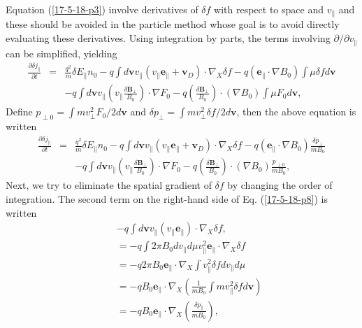 \documentclass{article}
\begin{document}
Equation (\ref{17-5-18-p3}) involve derivatives of $\delta f$ with respect to
space and $v_{\parallel}$ and these should be avoided in the particle method
whose goal is to avoid directly evaluating these derivatives. Using
integration by parts, the terms involving $\partial / \partial v_{\parallel}$
can be simplified, yielding
\begin{eqnarray}
  \frac{\partial \delta j_{\parallel}}{\partial t} & = & \frac{q^2}{m} \delta
  E_{\parallel} n_0 - q \int d\mathbf{v}v_{\parallel} (v_{\parallel}
  \mathbf{e}_{\parallel} +\mathbf{v}_D) \cdot \nabla_X \delta f - q
  (\mathbf{e}_{\parallel} \cdot \nabla B_0) \int \mu \delta f d\mathbf{v}
  \nonumber\\
  &  & - q \int d\mathbf{v}v_{\parallel} \left( v_{\parallel} \frac{\delta
  \mathbf{B}_{\perp}}{B_0} \right) \cdot \nabla F_0 - q \left( \frac{\delta
  \mathbf{B}_{\perp}}{B_0} \right) \cdot (\nabla B_0) \int \mu F_0
  d\mathbf{v}, 
\end{eqnarray}
Define $p_{\perp 0} = \int m v_{\perp}^2 F_0 / 2 d\mathbf{v}$ and $\delta
p_{\perp} = \int m v_{\perp}^2 \delta f / 2 d\mathbf{v}$, then the above
equation is written
\begin{eqnarray}
  \frac{\partial \delta j_{\parallel}}{\partial t} & = & \frac{q^2}{m} \delta
  E_{\parallel} n_0 - q \int d\mathbf{v}v_{\parallel} (v_{\parallel}
  \mathbf{e}_{\parallel} +\mathbf{v}_D) \cdot \nabla_X \delta f - q
  (\mathbf{e}_{\parallel} \cdot \nabla B_0) \frac{\delta p_{\perp}}{m B_0}
  \nonumber\\
  &  & - q \int d\mathbf{v}v_{\parallel} \left( v_{\parallel} \frac{\delta
  \mathbf{B}_{\perp}}{B_0} \right) \cdot \nabla F_0 - q \left( \frac{\delta
  \mathbf{B}_{\perp}}{B_0} \right) \cdot (\nabla B_0) \frac{p_{\perp 0}}{m
  B_0},  \label{17-5-18-p8}
\end{eqnarray}
Next, we try to eliminate the spatial gradient of $\delta f$ by changing the
order of integration. The second term on the right-hand side of Eq.
(\ref{17-5-18-p8}) is written
\begin{eqnarray}
  &  & - q \int d\mathbf{v}v_{\parallel} (v_{\parallel}
  \mathbf{e}_{\parallel}) \cdot \nabla_X \delta f, \nonumber\\
  &  & = - q \int 2 \pi B_0 d v_{\parallel} d \mu v_{\parallel}^2
  \mathbf{e}_{\parallel} \cdot \nabla_X \delta f \nonumber\\
  &  & = - q 2 \pi B_0 \mathbf{e}_{\parallel} \cdot \nabla_X \int
  v_{\parallel}^2 \delta f d v_{\parallel} d \mu \nonumber\\
  &  & = - q B_0 \mathbf{e}_{\parallel} \cdot \nabla_X \left( \frac{1}{m B_0}
  \int m v_{\parallel}^2 \delta f d\mathbf{v} \right) \nonumber\\
  &  & = - q B_0 \mathbf{e}_{\parallel} \cdot \nabla_X \left( \frac{\delta
  p_{\parallel}}{m B_0} \right), 
\end{eqnarray}
\end{document}
